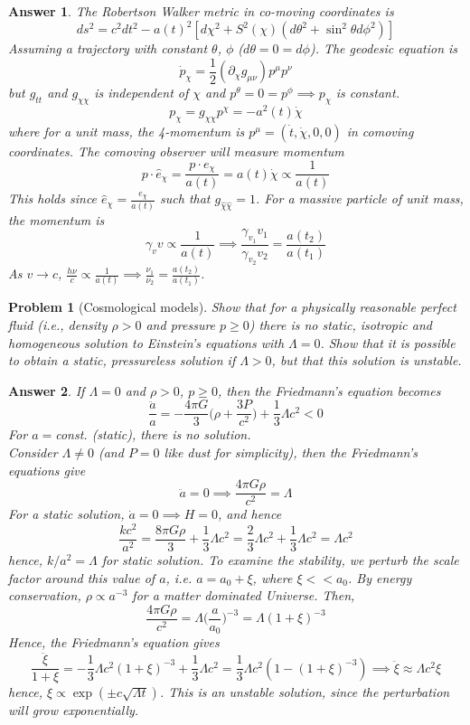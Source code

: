 \documentclass[a4paper]{article}
\theoremstyle{new2}
\newtheorem{ans}{Answer}[section]
\theoremstyle{new}
\newtheorem{qns}{Problem}[section]
\begin{document}
\begin{ans}
The Robertson Walker metric in co-moving coordinates is
$$ds^2=c^2dt^2-a(t)^2[d\chi^2+S^2(\chi)(d\theta^2+\sin^2\theta d\phi^2)]$$
Assuming a trajectory with constant $\theta$, $\phi$ ($d\theta=0=d\phi$). The geodesic equation is
$$\dot{p}_\chi=\frac{1}{2}(\partial_\chi g_{\mu\nu})p^\mu p^\nu$$
but $g_{tt}$ and $g_{\chi\chi}$ is independent of $\chi$ and $p^\theta=0=p^\phi\implies p_\chi$ is constant.
$$p_\chi=g_{\chi\chi}p^\chi=-a^2(t)\dot{\chi}$$
where for a unit mass, the 4-momentum is $p^\mu=(\dot{t},\dot{\chi},0,0)$ in comoving coordinates. The comoving observer will measure momentum
$$p\cdot\hat{e}_\chi=\frac{p\cdot e_\chi}{a(t)}=a(t)\dot{\chi}\propto\frac{1}{a(t)}$$
This holds since $\hat{e}_\chi=\frac{e_\chi}{a(t)}$ such that $g_{\hat{\chi}\hat{\chi}}=1$. For a massive particle of unit mass, the momentum is
$$\gamma_vv\propto\frac{1}{a(t)}\implies\frac{\gamma_{v_1}v_1}{\gamma_{v_2}v_2}=\frac{a(t_2)}{a(t_1)}$$
As $v\rightarrow c$, $\frac{h\nu}{c}\propto\frac{1}{a(t)}\implies\frac{\nu_1}{\nu_2}=\frac{a(t_2)}{a(t_1)}$.
\end{ans}
\newpage
\begin{qns}[Cosmological models]
Show that for a physically reasonable perfect fluid (i.e., density $\rho>0$ and pressure $p\geq 0$) there is no static, isotropic and homogeneous solution to Einstein’s equations with $\Lambda= 0$. Show that it is possible to obtain a static, pressureless solution if $\Lambda>0$, but that this solution is unstable.
\end{qns}
\begin{ans}
If $\Lambda=0$ and $\rho>0$, $p\geq0$, then the Friedmann's equation becomes
$$\frac{\ddot{a}}{a}=-\frac{4\pi G}{3}\bigg(\rho+\frac{3P}{c^2}\bigg)+\frac{1}{3}\Lambda c^2<0$$
For $a=$const. (static), there is no solution.\\[5pt]
Consider $\Lambda\neq 0$ (and $P=0$ like dust for simplicity), then the Friedmann's equations give
$$\ddot{a}=0\implies\frac{4\pi G\rho}{c^2}=\Lambda$$
For a static solution, $\dot{a}=0\implies H=0$, and hence
$$\frac{kc^2}{a^2}=\frac{8\pi G\rho}{3}+\frac{1}{3}\Lambda c^2=\frac{2}{3}\Lambda c^2+\frac{1}{3}\Lambda c^2=\Lambda c^2$$
hence, $k/a^2=\Lambda$ for static solution. To examine the stability, we perturb the scale factor around this value of $a$, i.e. $a=a_0+\xi$, where $\xi<<a_0$. By energy conservation, $\rho\propto a^{-3}$ for a matter dominated Universe. Then,
$$\frac{4\pi G\rho}{c^2}=\Lambda\bigg(\frac{a}{a_0}\bigg)^{-3}=\Lambda(1+\xi)^{-3}$$
Hence, the Friedmann's equation gives
$$\frac{\ddot{\xi}}{1+\xi}=-\frac{1}{3}\Lambda c^2(1+\xi)^{-3}+\frac{1}{3}\Lambda c^2=\frac{1}{3}\Lambda c^2(1-(1+\xi)^{-3})\implies\ddot{\xi}\approx\Lambda c^2\xi$$
hence, $\xi\propto\exp(\pm c\sqrt{\Lambda t})$. This is an unstable solution, since the perturbation will grow exponentially.
\end{ans}
\end{document}
